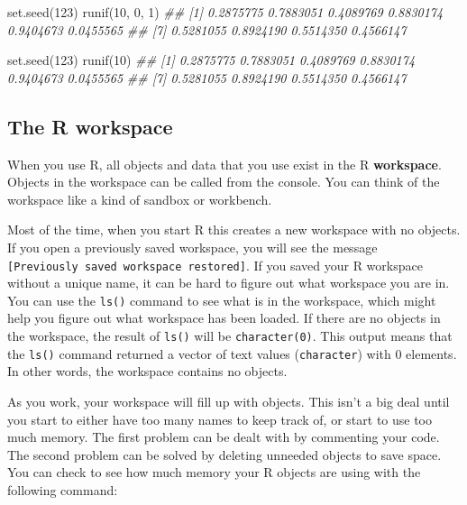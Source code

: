 \documentclass[
  13,
  letterpaper,
]{report}
\newenvironment{Shaded}{\begin{snugshade}}{\end{snugshade}}
\newcommand{\DecValTok}[1]{\textcolor[rgb]{0.68,0.00,0.00}{#1}}
\newcommand{\DocumentationTok}[1]{\textcolor[rgb]{0.37,0.37,0.37}{\textit{#1}}}
\newcommand{\FunctionTok}[1]{\textcolor[rgb]{0.28,0.35,0.67}{#1}}
\newcommand{\NormalTok}[1]{\textcolor[rgb]{0.00,0.23,0.31}{#1}}
\begin{document}
\begin{Shaded}
\begin{Highlighting}[]
\FunctionTok{set.seed}\NormalTok{(}\DecValTok{123}\NormalTok{)}
\FunctionTok{runif}\NormalTok{(}\DecValTok{10}\NormalTok{, }\DecValTok{0}\NormalTok{, }\DecValTok{1}\NormalTok{)}
\DocumentationTok{\#\#  [1] 0.2875775 0.7883051 0.4089769 0.8830174 0.9404673 0.0455565}
\DocumentationTok{\#\#  [7] 0.5281055 0.8924190 0.5514350 0.4566147}

\FunctionTok{set.seed}\NormalTok{(}\DecValTok{123}\NormalTok{)}
\FunctionTok{runif}\NormalTok{(}\DecValTok{10}\NormalTok{)}
\DocumentationTok{\#\#  [1] 0.2875775 0.7883051 0.4089769 0.8830174 0.9404673 0.0455565}
\DocumentationTok{\#\#  [7] 0.5281055 0.8924190 0.5514350 0.4566147}
\end{Highlighting}
\end{Shaded}

\subsection{The R workspace}\label{sec-02-comm-workspace}

When you use R, all objects and data that you use exist in the R
\textbf{workspace}. Objects in the workspace can be called from the
console. You can think of the workspace like a kind of sandbox or
workbench.

Most of the time, when you start R this creates a new workspace with no
objects. If you open a previously saved workspace, you will see the
message \texttt{{[}Previously\ saved\ workspace\ restored{]}}. If you
saved your R workspace without a unique name, it can be hard to figure
out what workspace you are in. You can use the \texttt{ls()} command to
see what is in the workspace, which might help you figure out what
workspace has been loaded. If there are no objects in the workspace, the
result of \texttt{ls()} will be \texttt{character(0)}. This output means
that the \texttt{ls()} command returned a vector of text values
(\texttt{character}) with 0 elements. In other words, the workspace
contains no objects.

As you work, your workspace will fill up with objects. This isn't a big
deal until you start to either have too many names to keep track of, or
start to use too much memory. The first problem can be dealt with by
commenting your code. The second problem can be solved by deleting
unneeded objects to save space. You can check to see how much memory
your R objects are using with the following command:
\end{document}
